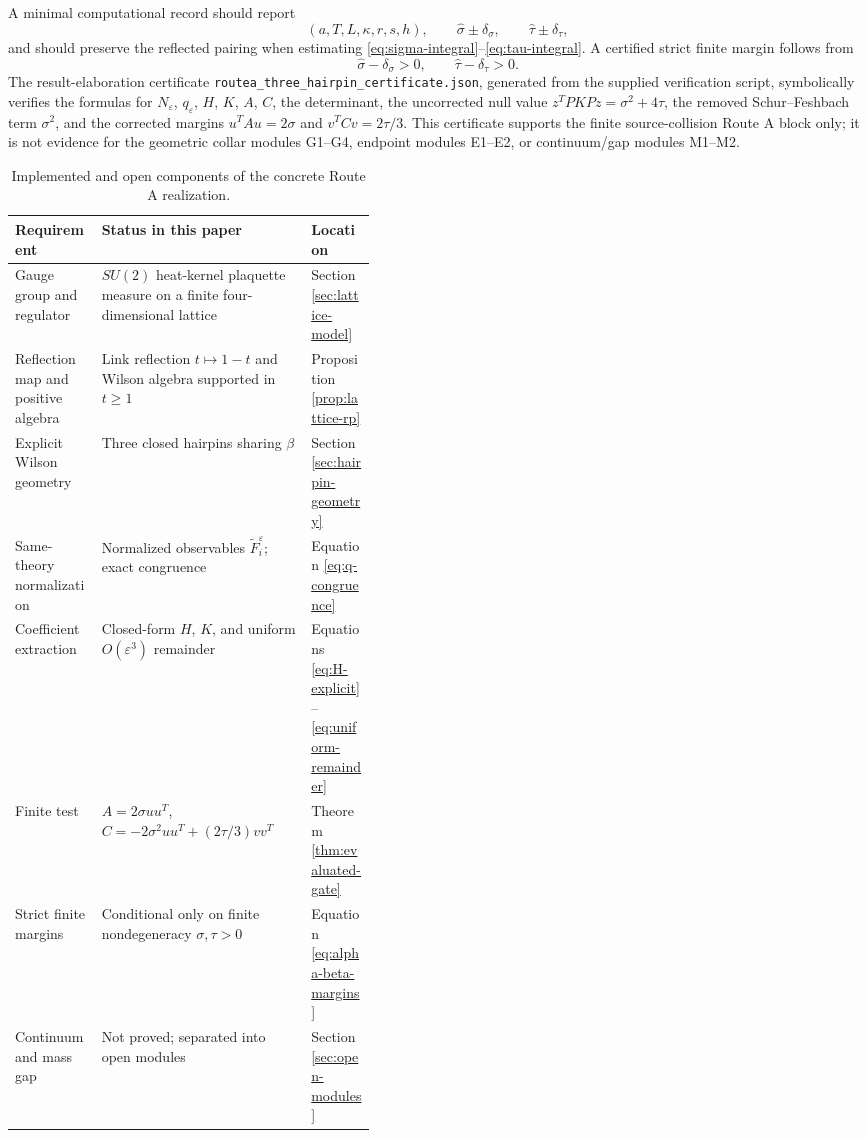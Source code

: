 \documentclass[11pt]{article}
\newcommand{\eps}{\varepsilon}
\begin{document}
A minimal computational record should report
\[
  (a,T,L,\kappa,r,s,h),
  \qquad
  \widehat\sigma\pm\delta_\sigma,
  \qquad
  \widehat\tau\pm\delta_\tau,
\]
and should preserve the reflected pairing when estimating \eqref{eq:sigma-integral}--\eqref{eq:tau-integral}.  A certified strict finite margin follows from
\begin{equation}
  \widehat\sigma-\delta_\sigma>0,
  \qquad
  \widehat\tau-\delta_\tau>0.
  \label{eq:certified-strictness}
\end{equation}
The result-elaboration certificate \texttt{routea\_three\_hairpin\_certificate.json}, generated from the supplied verification script, symbolically verifies the formulas for $N_\eps$, $q_\eps$, $H$, $K$, $A$, $C$, the determinant, the uncorrected null value $z^TPKPz=\sigma^2+4\tau$, the removed Schur--Feshbach term $\sigma^2$, and the corrected margins $u^TAu=2\sigma$ and $v^TCv=2\tau/3$.  This certificate supports the finite source-collision Route A block only; it is not evidence for the geometric collar modules G1--G4, endpoint modules E1--E2, or continuum/gap modules M1--M2.

\begin{table}[t]
\centering
\begin{tabularx}{\linewidth}{>{\raggedright\arraybackslash}p{0.24\linewidth}X>{\raggedright\arraybackslash}p{0.18\linewidth}}
\toprule
Requirement & Status in this paper & Location \\
\midrule
Gauge group and regulator & $SU(2)$ heat-kernel plaquette measure on a finite four-dimensional lattice & Section \ref{sec:lattice-model} \\
Reflection map and positive algebra & Link reflection $t\mapsto1-t$ and Wilson algebra supported in $t\ge1$ & Proposition \ref{prop:lattice-rp} \\
Explicit Wilson geometry & Three closed hairpins sharing $\beta$ & Section \ref{sec:hairpin-geometry} \\
Same-theory normalization & Normalized observables $\widetilde F_i^\eps$; exact congruence & Equation \eqref{eq:q-congruence} \\
Coefficient extraction & Closed-form $H$, $K$, and uniform $O(\eps^3)$ remainder & Equations \eqref{eq:H-explicit}--\eqref{eq:uniform-remainder} \\
Finite test & $A=2\sigma uu^T$, $C=-2\sigma^2uu^T+(2\tau/3)vv^T$ & Theorem \ref{thm:evaluated-gate} \\
Strict finite margins & Conditional only on finite nondegeneracy $\sigma,\tau>0$ & Equation \eqref{eq:alpha-beta-margins} \\
Continuum and mass gap & Not proved; separated into open modules & Section \ref{sec:open-modules} \\
\bottomrule
\end{tabularx}
\caption{Implemented and open components of the concrete Route A realization.}
\label{tab:route-a-status}
\end{table}
\end{document}

